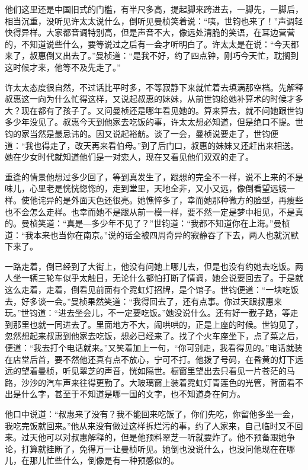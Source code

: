 \par 他们这里还是中国旧式的门槛，有半尺多高，提起脚来跨进去，一脚先，一脚后，相当沉重，没听见许太太说什么，倒听见曼桢笑着说：“咦，世钧也来了！”声调轻快得异样。大家都音调特别高，但是声音不大，像远处清脆的笑语，在耳边营营的，不知道说些什么，要等说过之后有一会才听明白了。许太太是在说：“今天都来了，叔惠倒又出去了。”曼桢道：“是我不好，约了四点钟，刚巧今天忙，耽搁到这时候才来，他等不及先走了。”
\par 许太太态度很自然，不过话比平时多，不等寂静下来就忙着去填满那空档。先解释叔惠这一向为什么忙得这样，又说起叔惠的妹妹，从前世钧给她补算术的时候才多大？现在都有了孩子了。又问曼桢还是哪年看见她的。算来算去，就不问她跟世钧多少年没见了。叔惠今天到他家去吃饭的事，许太太想必知道，但是绝口不提。世钧的家当然是最忌讳的。因又说起裕舫。谈了一会，曼桢说要走了，世钧便道：“我也得走了，改天再来看伯母。”到了后门口，叔惠的妹妹又还赶出来相送。她在少女时代就知道他们是一对恋人，现在又看见他们双双的走了。
\par 重逢的情景他想过多少回了，等到真发生了，跟想的完全不一样，说不上来的不是味儿，心里老是恍恍惚惚的，走到堂里，天地全非，又小又远，像倒看望远镜一样。使他诧异的是外面天色还很亮。她憔悴多了，幸而她那种微方的脸型，再瘦些也不会怎么走样。也幸而她不是跟从前一模一样，要不然一定是梦中相见，不是真的。曼桢笑道：“真是—多少年不见了？”世钧道：“我都不知道你在上海。”曼桢道：“我本来也当你在南京。”说的话全被四周奇异的寂静吞了下去，两人也就沉默下来了。
\par 一路走着，倒已经到了大街上，他没有问她上哪儿去，但是也没有约她去吃饭。两人坐一辆三轮车似乎太触目，无论什么都怕打断了情调，她会说要回去了。于是就这么走着，走着，倒看见前面有个霓虹灯招牌，是个馆子。世钧便道：“一块吃饭去，好多谈一会。”曼桢果然笑道：“我得回去了，还有点事。你过天跟叔惠来玩。”世钧道：“进去坐会儿，不一定要吃饭。”她没说什么。还有好一截子路，等走到那里也就一同进去了。里面地方不大，闹哄哄的，正是上座的时候。世钧见了，忽然想起来叔惠到他家去吃饭，想必已经来了。找了个火车座坐下，点了菜之后，便道：“我去打个电话就来。”又笑着加上一句，“你可别走，我看得见的。”电话就装在店堂后首，要不然他还真有点不放心，宁可不打。他拨了号码，在昏黄的灯下远远的望着曼桢，听见翠芝的声音，恍如隔世。橱窗里望出去只看见一片苍茫的马路，沙沙的汽车声来往得更勤了。大玻璃窗上装着霓虹灯青莲色的光管，背面看不出是什么字，甚至于不知道是哪一国的文字，也不知道身在何方。
\par 他口中说道：“叔惠来了没有？我不能回来吃饭了，你们先吃，你留他多坐一会，我吃完饭就回来。”他从来没有做过这样拆烂污的事，约了人家来，自己临时又不回来。过天他可以对叔惠解释的，但是他预料翠芝一听就要炸了。他不预备跟她争论，打算就挂断了，免得万一让曼桢听见。她倒也没说什么，也没问他现在在哪儿，在那儿忙些什么，倒像是有一种预感似的。
